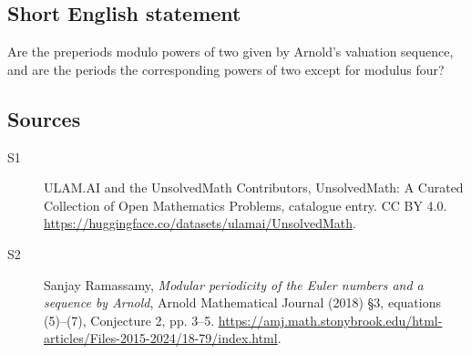 \documentclass[11pt]{article}
\begin{document}
\subsection{Short English statement}
Are the preperiods modulo powers of two given by Arnold's valuation sequence, and are the periods the corresponding powers of two except for modulus four?
\subsection{Sources}
\begin{description}
\item[\hypertarget{source:statement:1}{S1}] ULAM.AI and the UnsolvedMath Contributors, UnsolvedMath: A Curated Collection of Open Mathematics Problems, catalogue entry. CC BY 4.0. \url{https://huggingface.co/datasets/ulamai/UnsolvedMath}.
\item[\hypertarget{source:statement:2}{S2}] Sanjay Ramassamy, \emph{Modular periodicity of the Euler numbers and a sequence by Arnold}, Arnold Mathematical Journal (2018) \S3, equations (5)--(7), Conjecture 2, pp. 3--5. \url{https://amj.math.stonybrook.edu/html-articles/Files-2015-2024/18-79/index.html}.
\end{description}
\label{end:statement}
\end{document}
